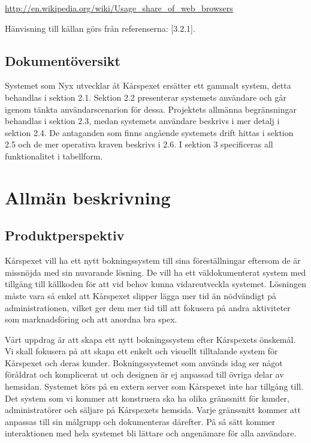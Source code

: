 \documentclass[a4paper, twoside, 11pt, titlepage]{article}
\begin{document}
		\url{http://en.wikipedia.org/wiki/Usage\_share\_of\_web_browsers}

		Hänvisning till källan görs från referenserna: [3.2.1].

	\subsection{Dokumentöversikt}


	Systemet som Nyx utvecklar åt Kårspexet ersätter ett gammalt system, detta behandlas i sektion 2.1. Sektion 2.2 presenterar systemets användare och går igenom tänkta användarscenarion för dessa. Projektets allmänna begränsningar behandlas i sektion 2.3, medan systemets användare beskrivs i mer detalj i sektion 2.4. De antaganden som finns angående systemets drift hittas i sektion 2.5 och de mer operativa kraven beskrivs i 2.6. I sektion 3 specificeras all funktionalitet i tabellform.

\clearpage
\section{Allmän beskrivning}



	\subsection{Produktperspektiv}


	Kårspexet vill ha ett nytt bokningssystem till sina föreställningar eftersom de är missnöjda med sin nuvarande lösning. De vill ha ett väldokumenterat system med tillgång till källkoden för att vid behov kunna vidareutveckla systemet. Lösningen måste vara så enkel att Kårspexet slipper lägga mer tid än nödvändigt på administrationen, vilket ger dem mer tid till att fokusera på andra aktiviteter som marknadsföring och att anordna bra spex.

	Vårt uppdrag är att skapa ett nytt bokningssystem efter Kårspexets önskemål. Vi skall fokusera på att skapa ett enkelt och visuellt tilltalande system för Kårspexet och deras kunder. Bokningssystemet som används idag ser något föråldrat och komplicerat ut och designen är ej anpassad till övriga delar av hemsidan. Systemet körs på en extern server som Kårspexet inte har tillgång till. Det system som vi kommer att konstruera ska ha olika gränssnitt för kunder, administratörer och säljare på Kårspexets hemsida. Varje gränssnitt kommer att anpassas till sin målgrupp och dokumenteras därefter. På så sätt kommer interaktionen med hela systemet bli lättare och angenämare för alla användare.
\end{document}
